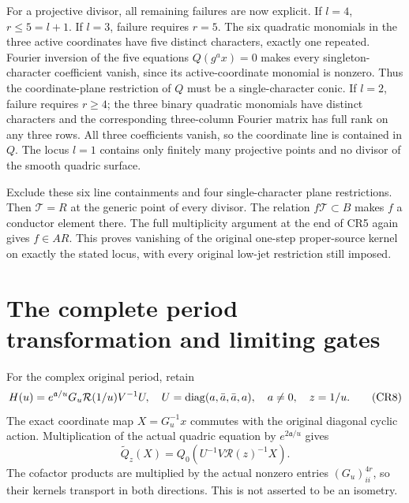 For a projective divisor, all remaining failures are now explicit.
If $l=4$, $r\le5=l+1$.  If $l=3$, failure requires $r=5$.
The six quadratic monomials in the three active coordinates
have five distinct characters, exactly one repeated.  Fourier
inversion of the five equations $Q(g^a x)=0$ makes every
singleton-character coefficient vanish, since its active-coordinate
monomial is nonzero.  Thus the coordinate-plane restriction of
$Q$ must be a single-character conic.  If $l=2$, failure requires
$r\ge4$; the three binary quadratic monomials have distinct
characters and the corresponding three-column Fourier matrix
has full rank on any three rows.  All three coefficients vanish,
so the coordinate line is contained in $Q$.  The locus $l=1$
contains only finitely many projective points and no divisor of
the smooth quadric surface.

Exclude these six line containments and four single-character
plane restrictions.  Then $\mathcal T=R$ at the generic point
of every divisor.  The relation $f\mathcal T\subset B$ makes
$f$ a conductor element there.  The full multiplicity argument
at the end of CR5 again gives $f\in AR$.  This proves vanishing
of the original one-step proper-source kernel on exactly the
stated locus, with every original low-jet restriction still imposed.

\section{The complete period transformation and limiting gates}
For the complex original period, retain
\[
 H(u)=e^{\mathfrak a/u}G_u\mathcal R(1/u)V^{-1}U,
 \quad U=\operatorname{diag}(a,\bar a,\bar a,a),\quad a\ne0,\quad z=1/u.
                                                                    \tag{CR8}
\]
The exact coordinate map $X=G_u^{-1}x$ commutes with the original
diagonal cyclic action.  Multiplication of the actual quadric
equation by $e^{2\mathfrak a/u}$ gives
\[
 \widetilde Q_z(X)=Q_0(U^{-1}V\mathcal R(z)^{-1}X).              \tag{CR9}
\]
The cofactor products are multiplied by the actual nonzero
entries $(G_u)_{ii}^{4r}$, so their kernels transport in both
directions.  This is not asserted to be an isometry.

